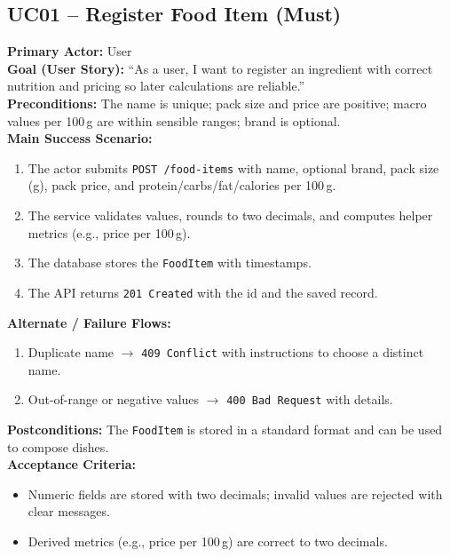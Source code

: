 \documentclass[11pt]{article}
\begin{document}
\subsection*{UC01 -- Register Food Item (Must)}
\textbf{Primary Actor:} User\\
\textbf{Goal (User Story):} ``As a user, I want to register an ingredient with correct nutrition and pricing so later calculations are reliable.''\\
\textbf{Preconditions:} The name is unique; pack size and price are positive; macro values per 100\,g are within sensible ranges; brand is optional.\\
\textbf{Main Success Scenario:}
\begin{enumerate}[label=\arabic*.]
  \item The actor submits \texttt{POST /food-items} with name, optional brand, pack size (g), pack price, and protein/carbs/fat/calories per 100\,g.
  \item The service validates values, rounds to two decimals, and computes helper metrics (e.g., price per 100\,g).
  \item The database stores the \texttt{FoodItem} with timestamps.
  \item The API returns \texttt{201 Created} with the id and the saved record.
\end{enumerate}
\textbf{Alternate / Failure Flows:}
\begin{enumerate}[label=\arabic*F.]
  \item Duplicate name $\rightarrow$ \texttt{409 Conflict} with instructions to choose a distinct name.
  \item Out-of-range or negative values $\rightarrow$ \texttt{400 Bad Request} with details.
\end{enumerate}
\textbf{Postconditions:} The \texttt{FoodItem} is stored in a standard format and can be used to compose dishes.\\
\textbf{Acceptance Criteria:}
\begin{itemize}[noitemsep]
  \item Numeric fields are stored with two decimals; invalid values are rejected with clear messages.
  \item Derived metrics (e.g., price per 100\,g) are correct to two decimals.
\end{itemize}
\end{document}
